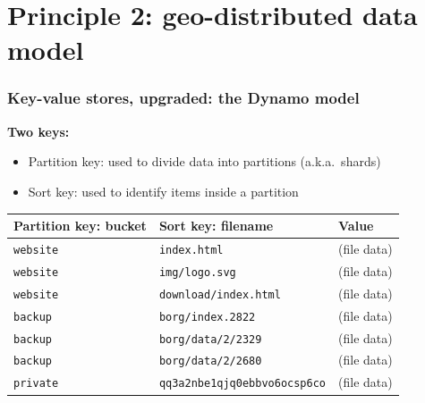 \documentclass[aspectratio=169,xcolor={svgnames}]{beamer}
\begin{document}

\section{Principle 2: geo-distributed data model}

\begin{frame}
	\frametitle{Key-value stores, upgraded: the Dynamo model}
	\textbf{Two keys:}
	\begin{itemize}
		\item Partition key: used to divide data into partitions {\small (a.k.a.~shards)}
		\item Sort key: used to identify items inside a partition
	\end{itemize}

	\vspace{1em}

	\begin{center}
	\begin{tabular}{|l|l|p{3cm}|}
		\hline
		\textbf{Partition key: bucket} & \textbf{Sort key: filename} & \textbf{Value} \\
		\hline
		\hline
		\texttt{website} & \texttt{index.html} & (file data) \\
		\hline
		\texttt{website} & \texttt{img/logo.svg} & (file data) \\
		\hline
		\texttt{website} & \texttt{download/index.html} & (file data) \\
		\hline
		\hline
		\texttt{backup} & \texttt{borg/index.2822} & (file data) \\
		\hline
		\texttt{backup} & \texttt{borg/data/2/2329} & (file data) \\
		\hline
		\texttt{backup} & \texttt{borg/data/2/2680} & (file data) \\
		\hline
		\hline
		\texttt{private} & \texttt{qq3a2nbe1qjq0ebbvo6ocsp6co} & (file data) \\
		\hline
	\end{tabular}
	\end{center}
\end{frame}
\end{document}
